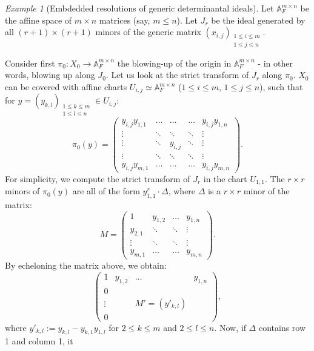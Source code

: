 \documentclass[11pt,english]{article}
\numberwithin{equation}{section}
\numberwithin{figure}{section}
\theoremstyle{definition}
\theoremstyle{plain}
\theoremstyle{remark}
\newtheorem{exmp}[df]{Example}
\begin{document}
\begin{exmp}[Embdedded resolutions of generic determinantal ideals]

Let $\mathbb{A}_{F}^{m\times n}$ be the affine space of $m\times n$
matrices (say, $m\leq n$). Let $J_{r}$ be the ideal generated by
all $(r+1)\times(r+1)$ minors of the generic matrix $(x_{i,j})_{\substack{1\leq i\leq m\\
1\leq j\leq n
}
}$.

Consider first $\pi_{0}:X_{0}\rightarrow\mathbb{A}_{F}^{m\times n}$
the blowing-up of the origin in $\mathbb{A}_{F}^{m\times n}$ - in
other words, blowing up along $J_{0}$. Let us look at the strict
transform of $J_{r}$ along $\pi_{0}$. $X_{0}$ can be covered with
affine charts $U_{i,j}\simeq\mathbb{A}_{F}^{m\times n}$ ($1\leq i\leq m$,
$1\leq j\leq n$), such that for $y=(y_{k,l})_{\substack{1\leq k\leq m\\
1\leq l\leq n
}
}\in U_{i,j}$:\[
\pi_0(y)
=
\left(
\begin{array}{ccccc}
y_{i,j}y_{1,1} & \ldots & \ldots & \ldots & y_{i,j}y_{1,n} \\
\vdots & \ddots & \ddots & \ddots & \vdots \\
\vdots & \ddots & y_{i,j} & \ddots & \vdots \\
\vdots & \ddots & \ddots & \ddots & \vdots \\
y_{i,j}y_{m,1} & \ldots & \ldots & \ldots & y_{i,j}y_{m,n}
\end{array}
\right)
.
\]For simplicity, we compute the strict transform of $J_{r}$ in the
chart $U_{1,1}$. The $r\times r$ minors of $\pi_{0}(y)$ are all
of the form $y_{1,1}^{r}\cdot\Delta$, where $\Delta$ is a $r\times r$
minor of the matrix:\[
M=
\left(
\begin{array}{cccc}
1 & y_{1,2} & \ldots & y_{1,n} \\
y_{2,1} & \ddots  & \ddots & \vdots \\
\vdots & \ddots & \ddots  & \vdots \\
y_{m,1} & \ldots & \ldots  & y_{m,n}
\end{array}
\right)
.
\]By echeloning the matrix above, we obtain:\[
\left(
\begin{array}{cccc}
1 & y_{1,2} & \ldots & y_{1,n} \\
0 &  &  &  \\
\vdots & & M'=(y'_{k,l})  &  \\
0 & & &
\end{array}
\right)
,
\]where $y'_{k,l}:=y_{k,l}-y_{k,1}y_{1,l}$ for $2\leq k\leq m$ and
$2\leq l\leq n$. Now, if $\Delta$ contains row 1 and column 1, it

\end{exmp}
\end{document}
